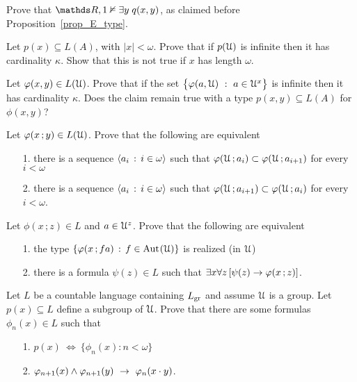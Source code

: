 \begin{exercise}\label{ex_E_type}
Prove that $\RR,1\notmodels\E y\;q(x,y)$, as claimed before Proposition~\ref{prop_E_type}.
\end{exercise}

\begin{exercise}\label{cadinalitafinitasaturazione}
Let $p(x)\subseteq L(A)$, with $|x|<\omega$. 
Prove that if $p(\EuScript U)$ is infinite then it has cardinality $\kappa$. 
Show that this is not true if $x$ has length $\omega$. 
\end{exercise}

\begin{exercise}\label{cadinalitafinitasaturazioneinsiemi}
Let $\varphi(x,y)\in L(\EuScript U)$. Prove that if the set $\big\{\varphi(a,\EuScript U)\ :\ a\in\EuScript U^{x}\big\}$ is infinite then it has cardinality $\kappa$.
Does the claim remain true with a type $p(x,y)\subseteq L(A)$ for $\phi(x,y)$? 
\end{exercise}

\begin{exercise}\label{ex_saturazione_catene_insiemi}
Let $\varphi(x\,;y)\in L(\EuScript U)$. Prove that the following are equivalent
\begin{itemize}
\item[1.] there is a sequence $\langle a_i\,:\,i\in\omega\rangle$ such that $\varphi(\EuScript U\,;a_i)\subset\varphi(\EuScript U\,;a_{i+1})$ for every $i<\omega$
\item[2.] there is a sequence $\langle a_i\,:\,i\in\omega\rangle$ such that $\varphi(\EuScript U\,;a_{i+1})\subset\varphi(\EuScript U\,;a_i)$ for every $i<\omega$.
\end{itemize}
\end{exercise}

\begin{exercise}\label{ex_ak_definibilita}
  Let $\phi(x\,;z)\in L$ and $a\in\EuScript U^z$.
  Prove that the following are equivalent
  \begin{itemize}
    \item[1.] the type $\{\varphi(x\,;fa)\,:\,f\in{\rm Aut\kern.15ex}(\EuScript U)\}$ is realized (in $\EuScript U$)
    \item[2.] there is a formula $\psi(z)\in L$ such that $\exists x\forall z\,[\psi(z)\rightarrow\varphi(x\,;z)]$.
  \end{itemize}  
\end{exercise}

\begin{exercise}\label{ex_typedef_groups}
  Let $L$ be a countable language containing $L_{\rm gr}$ and assume $\EuScript U$ is a group.
  Let $p(x)\subseteq L$ define a subgroup of $\EuScript U$.
  Prove that there are some formulas $\phi_n(x)\in L$ such that 
  \begin{itemize}
    \item[1.] $p(x)\ \iff\ \{\phi_n(x):n<\omega\}$
    \item[2.] $\phi_{n+1}(x)\wedge\phi_{n+1}(y)\ \imp\ \phi_n(x\cdot y)$.
  \end{itemize}
\end{exercise}

